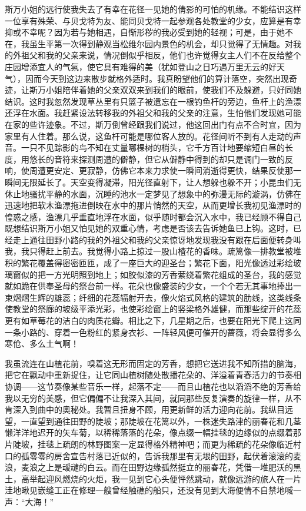 \par 斯万小姐的远行使我失去了有幸在花径一见她的倩影的可怕的机缘。不能结识这样一位享有殊荣、与贝戈特为友、能同贝戈特一起参观各处教堂的少女，应算是有幸抑或不幸呢？因为若与她相遇，自惭形秽的我必受到她的轻视；可是，由于她不在，我虽生平第一次得到静观当松维尔园内景色的机会，却只觉得了无情趣。对我的外祖父和我的父亲来说，情况倒似乎相反，他们也许觉得女主人们不在反给整个庄园增添宜人的气氛，使它具有难得的美（犹如登山之日巧遇万里无云的好天气），因而今天到这边来散步就格外适时。我真盼望他们的算计落空，突然出现奇迹，让斯万小姐陪伴着她的父亲双双来到我们的眼前，使我们不及躲避，只好同她结识。这时我忽然发现草丛里有只篮子被遗忘在一根钓鱼杆的旁边，鱼杆上的渔漂还浮在水面。我赶紧设法转移我的外祖父和我的父亲的注意，生怕他们发现她可能在家的些许迹象。不过，斯万倒曾经跟我们说过，他这回出门有点不合时宜，因为家里有人住着。那么说，这鱼杆可能是哪位客人放的。花径间听不到有人走动的声音。一只不见踪影的鸟不知在丈量哪棵树的梢头，它千方百计地要缩短白昼的长度，用悠长的音符来探测周遭的僻静，但它从僻静中得到的却只是调门一致的反响，使周遭更安定、更寂静，仿佛它本来力求使一瞬间消逝得更快，结果反使那一瞬间无限延长了。天空变得凝滞，阳光径直射下，让人想躲也躲不开；小昆虫们无休止地骚扰平静的水面，沉睡的池水一定梦见了想象中的弥漫无际的漩涡，仿佛在迅速地把软木渔漂拖进倒映在水中的那片悄然的天空，从而更增长我初见渔漂时的惶惑之感，渔漂几乎垂直地浮在水面，似乎随时都会沉入水中，我已经顾不得自己既想结识斯万小姐又怕见她的双重心情，考虑是否该去告诉她鱼已上钩。这时，已经走上通往田野小路的我的外祖父和我的父亲惊讶地发现我没有跟在后面便转身叫我，我只得赶上前去。我觉得小路上掠过一股山楂花的香味。疏篱像一排教堂被堆积的繁花覆盖得密密匝匝，成了一座巨大的迎圣台；繁花下面，阳光像透过彩绘玻璃窗似的把一方光明照到地上；如胶似漆的芳香萦绕着繁花组成的圣台，我的感觉就如跪在供奉圣母的祭台前一样。花朵也像盛装的少女，一个个若无其事地捧出一束熠熠生辉的雄蕊；纤细的花蕊辐射开去，像火焰式风格的建筑的肋线，这类线条使教堂的祭廊的坡级平添光彩，也使彩绘窗上的竖梁格外雄健，而那些绽开的花蕊更有如草莓花的洁白的肉质花瓣。相比之下，几星期之后，也要在阳光下爬上这同一条小路的、穿着一色粉红的紧身衣衫、一阵轻风便可催开的蔷薇，将会显得多么寒伧、多么土气啊！
\par 我虽流连在山楂花前，嗅着这无形而固定的芳香，想把它送进我不知所措的脑海，把它在飘动中重新捉住，让它同山楂树随处散播花朵的、洋溢着青春活力的节奏相协调——这节奏像某些音乐一样，起落不定——而且山楂花也以滔滔不绝的芳香给我以无穷的美感，但它偏偏不让我深入其间，就同那些反复演奏的旋律一样，从不肯深入到曲中的奥秘处。我暂且扭身不顾，用更新鲜的活力迎向花前。我纵目远望，一直望到通往田野的陡坡；那陡坡在花篱以外，一株迷失路津的丽春花和几茎懒洋洋地迟开的矢车菊，以稀稀落落的花朵，像点缀一幅挂毯的边缘似的点缀着那片陡坡，挂毯上疏朗的林野图案一定显得格外精神吧；而更为稀疏的花朵像临近村口的孤零零的房舍宣告村落已近似的，告诉我那里有无垠的田野，起伏着滚滚的麦浪，麦浪之上是叆叇的白云。而在田野边缘孤然挺立的丽春花，凭借一堆肥沃的黑土，高举起迎风燃烧的火炬，我一见到它心头便怦然跳动，就像远游的旅人在一片洼地瞅见嵌缝工正在修理一艘曾经触礁的船只，还没有见到大海便情不自禁地喊一声：“大海！”
